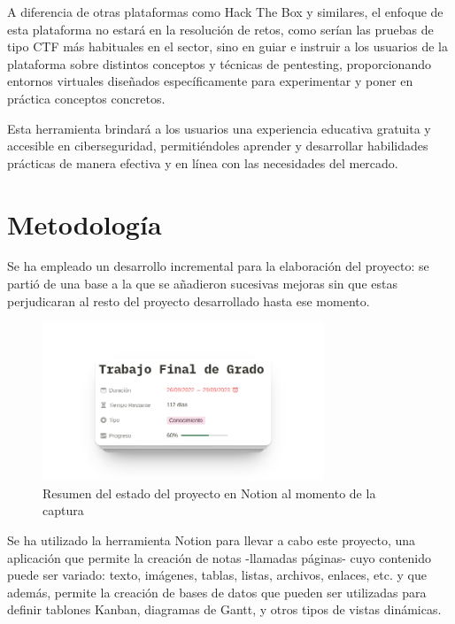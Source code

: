         A diferencia de otras plataformas como Hack The Box y similares, el enfoque de esta plataforma no estará en la resolución de retos, como serían las pruebas de tipo CTF más habituales en el sector, sino en guiar e instruir a los usuarios de la plataforma sobre distintos conceptos y técnicas de pentesting, proporcionando entornos virtuales diseñados específicamente para experimentar y poner en práctica conceptos concretos.
        
        Esta herramienta brindará a los usuarios una experiencia educativa gratuita y accesible en ciberseguridad, permitiéndoles aprender y desarrollar habilidades prácticas de manera efectiva y en línea con las necesidades del mercado.
    
    
    \section{Metodología}
    
        Se ha empleado un desarrollo incremental para la elaboración del proyecto: se partió de una base a la que se añadieron sucesivas mejoras sin que estas perjudicaran al resto del proyecto desarrollado hasta ese momento.

        \begin{figure}[htbp]
            \centering

            \includegraphics[width=0.75\textwidth]{images/Capturas/Notion resumen.png}

            \caption{Resumen del estado del proyecto en Notion al momento de la captura}
            \label{fig:notion-resumen}
        \end{figure}

        Se ha utilizado la herramienta Notion para llevar a cabo este proyecto, una aplicación que permite la creación de notas -llamadas páginas- cuyo contenido puede ser variado: texto, imágenes, tablas, listas, archivos, enlaces, etc. y que además, permite la creación de bases de datos que pueden ser utilizadas para definir tablones Kanban, diagramas de Gantt, y otros tipos de vistas dinámicas.

